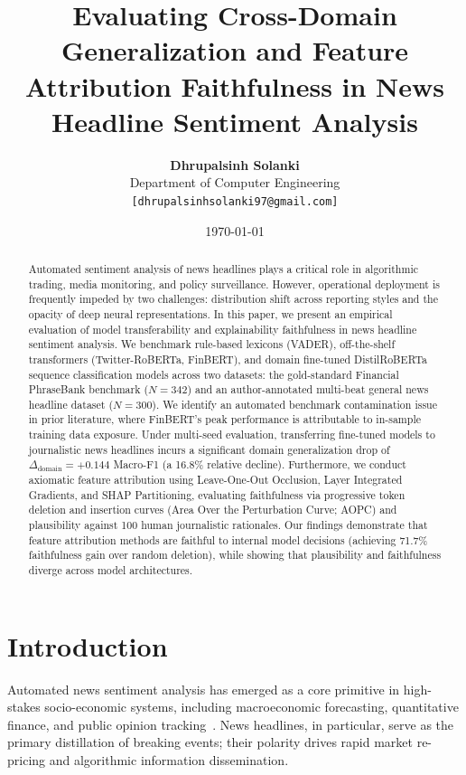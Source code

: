 \documentclass[10pt,twocolumn,letterpaper]{article}
\title{\textbf{Evaluating Cross-Domain Generalization and Feature Attribution Faithfulness in News Headline Sentiment Analysis}}
\author{
  \textbf{Dhrupalsinh Solanki} \\
  Department of Computer Engineering \\
  \texttt{[dhrupalsinhsolanki97@gmail.com]}
}
\date{\today}
\begin{document}
\maketitle

\begin{abstract}
Automated sentiment analysis of news headlines plays a critical role in algorithmic trading, media monitoring, and policy surveillance. However, operational deployment is frequently impeded by two challenges: distribution shift across reporting styles and the opacity of deep neural representations. In this paper, we present an empirical evaluation of model transferability and explainability faithfulness in news headline sentiment analysis. We benchmark rule-based lexicons (VADER), off-the-shelf transformers (Twitter-RoBERTa, FinBERT), and domain fine-tuned DistilRoBERTa sequence classification models across two datasets: the gold-standard Financial PhraseBank benchmark ($N=342$) and an author-annotated multi-beat general news headline dataset ($N=300$). We identify an automated benchmark contamination issue in prior literature, where FinBERT's peak performance is attributable to in-sample training data exposure. Under multi-seed evaluation, transferring fine-tuned models to journalistic news headlines incurs a significant domain generalization drop of $\Delta_{\text{domain}} = +0.144$ Macro-F1 (a 16.8\% relative decline). Furthermore, we conduct axiomatic feature attribution using Leave-One-Out Occlusion, Layer Integrated Gradients, and SHAP Partitioning, evaluating faithfulness via progressive token deletion and insertion curves (Area Over the Perturbation Curve; AOPC) and plausibility against 100 human journalistic rationales. Our findings demonstrate that feature attribution methods are faithful to internal model decisions (achieving 71.7\% faithfulness gain over random deletion), while showing that plausibility and faithfulness diverge across model architectures.
\end{abstract}

\section{Introduction}

Automated news sentiment analysis has emerged as a core primitive in high-stakes socio-economic systems, including macroeconomic forecasting, quantitative finance, and public opinion tracking~\cite{malo2014good}. News headlines, in particular, serve as the primary distillation of breaking events; their polarity drives rapid market re-pricing and algorithmic information dissemination.
\end{document}
